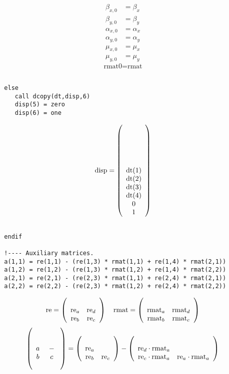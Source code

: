 \documentclass{cern-art} %
\begin{document}
\[
\begin{aligned}\beta_{x,0} & =\beta_{x}\\
\beta_{y,0} & =\beta_{y}\\
\alpha_{x,0} & =\alpha_{x}\\
\alpha_{y,0} & =\alpha_{y}\\
\mu_{x,0} & =\mu_{x}\\
\mu_{y,0} & =\mu_{y}
\end{aligned}
\]
\[
\text{rmat0}=\text{rmat}
\]

\begin{lstlisting}[firstnumber=last]

  else
     call dcopy(dt,disp,6)
     disp(5) = zero
     disp(6) = one
\end{lstlisting}

\[
\text{disp}=\left(\begin{array}[t]{c}
\text{dt(1)}\\
\text{dt(2)}\\
\text{dt(3)}\\
\text{dt(4)}\\
0\\
1
\end{array}\right)
\]

\begin{lstlisting}[firstnumber=last]

  endif

  !---- Auxiliary matrices.
  a(1,1) = re(1,1) - (re(1,3) * rmat(1,1) + re(1,4) * rmat(2,1))
  a(1,2) = re(1,2) - (re(1,3) * rmat(1,2) + re(1,4) * rmat(2,2))
  a(2,1) = re(2,1) - (re(2,3) * rmat(1,1) + re(2,4) * rmat(2,1))
  a(2,2) = re(2,2) - (re(2,3) * rmat(1,2) + re(2,4) * rmat(2,2))
\end{lstlisting}

\[
\text{re}=\left(\begin{array}[t]{cc}
\text{re}_{a} & \text{re}_{d}\\
\text{re}_{b} & \text{re}_{c}
\end{array}\right)\quad\text{rmat}=\left(\begin{array}[t]{cc}
\text{rmat}_{a} & \text{rmat}_{d}\\
\text{rmat}_{b} & \text{rmat}_{c}
\end{array}\right)
\]
\[
\left(\begin{array}[t]{cc}
a & -\\
b & \begin{array}[t]{cc}
c\\
\\
\end{array}
\end{array}\right)=\left(\begin{array}[t]{cc}
\text{re}_{a}\\
\text{re}_{b} & \text{re}_{c}
\end{array}\right)-\left(\begin{array}[t]{cc}
\text{re}_{d}\cdot\text{rmat}_{a}\\
\text{re}_{c}\cdot\text{rmat}_{a} & \text{re}_{a}\cdot\text{rmat}_{a}
\end{array}\right)
\]
\end{document}
